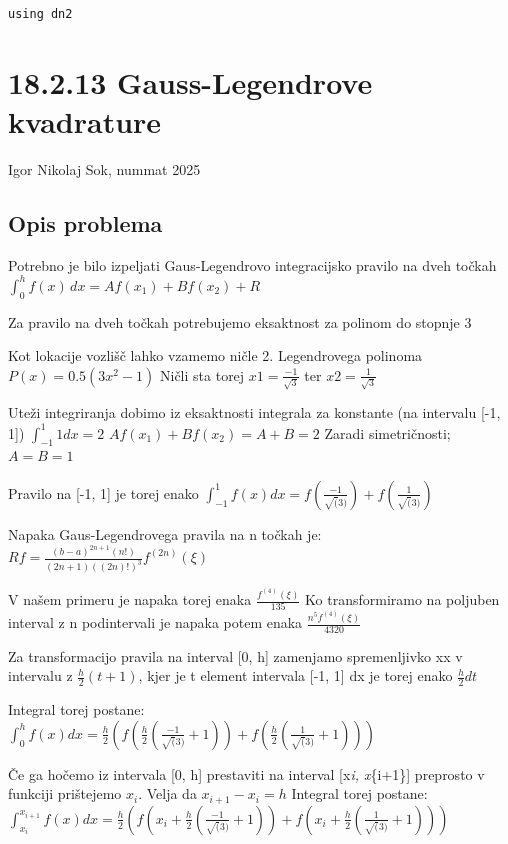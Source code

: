 \documentclass[12pt,a4paper]{article}
\begin{document}
\begin{verbatim}
using dn2
\end{verbatim}

\section{18.2.13 Gauss-Legendrove kvadrature}
Igor Nikolaj Sok, nummat 2025


\subsection{Opis problema}
Potrebno je bilo izpeljati Gaus-Legendrovo integracijsko pravilo na dveh točkah $\int_0^h f(x)\,dx = A f(x_1) + B f(x_2) + R$


Za pravilo na dveh točkah potrebujemo eksaktnost za polinom do stopnje 3


Kot lokacije vozlišč lahko vzamemo ničle 2. Legendrovega polinoma $P(x) = 0.5 ( 3x^2 - 1)$ Ničli sta torej $x1 = \frac{-1}{\sqrt{3}}$ ter $x2 = \frac{1}{\sqrt{3}}$


Uteži integriranja dobimo iz eksaktnosti integrala za konstante (na intervalu [-1, 1]) $\int_{-1}^1 1dx = 2$ $A f(x_1) + B f(x_2) = A + B = 2$ Zaradi simetričnosti; $A = B = 1$


Pravilo na [-1, 1] je torej enako $\int_{-1}^1 f(x)dx = f(\frac{-1}{\sqrt(3)}) + f(\frac{1}{\sqrt(3)})$


Napaka Gaus-Legendrovega pravila na n točkah je: $Rf = \frac{(b-a)^{2n+1} (n!)}{(2n+1)((2n)!)^3}f^{(2n)}(\xi)$


V našem primeru je napaka torej enaka $\frac{f^{(4)}(\xi)}{135}$ Ko transformiramo na poljuben interval z n podintervali je napaka potem enaka $\frac{n^5 f^{(4)}(\xi)}{4320}$


Za transformacijo pravila na interval [0, h] zamenjamo spremenljivko xx v intervalu z $\frac{h}{2}(t+1)$, kjer je t element intervala [-1, 1] dx je torej enako $\frac{h}{2}dt$


Integral torej postane: $\int_0^h f(x)dx = \frac{h}{2}(f(\frac{h}{2}(\frac{-1}{\sqrt(3)} + 1)) + f(\frac{h}{2}(\frac{1}{\sqrt(3)} + 1)))$


Če ga hočemo iz intervala [0, h] prestaviti na interval [x\emph{i, x}\{i+1\}] preprosto v funkciji prištejemo $x_i$. Velja da $x_{i+1} - x_i = h$ Integral torej postane:  $\int_{x_i}^{x_{i+1}} f(x)dx = \frac{h}{2}(f(x_i + \frac{h}{2}(\frac{-1}{\sqrt(3)} + 1)) + f(x_i + \frac{h}{2}(\frac{1}{\sqrt(3)} + 1)))$
\end{document}
